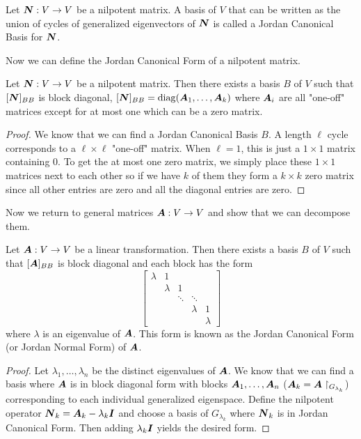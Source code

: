 \begin{definition}
    Let $\boldsymbol{N}:V\to V$ be a nilpotent matrix. A basis of $V$ that can be written as the union of cycles of generalized eigenvectors of $\boldsymbol{N}$ is called a Jordan Canonical Basis for $\boldsymbol{N}$.
\end{definition}

Now we can define the Jordan Canonical Form of a nilpotent matrix.

\begin{theorem}
    Let $\boldsymbol{N}:V\to V$ be a nilpotent matrix. Then there exists a basis $B$ of $V$ such that $[\boldsymbol{N}]_{BB}$ is block diagonal, $[\boldsymbol{N}]_{BB}=\mathrm{diag}(\boldsymbol{A}_1,\dots,\boldsymbol{A}_k)$ where $\boldsymbol{A}_i$ are all "one-off" matrices except for at most one which can be a zero matrix.
\end{theorem}

\begin{proof}
    We know that we can find a Jordan Canonical Basis $B$. A length $\ell$ cycle corresponds to a $\ell\times\ell$ "one-off" matrix. When $\ell=1$, this is just a $1\times 1$ matrix containing $0$. To get the at most one zero matrix, we simply place these $1\times 1$ matrices next to each other so if we have $k$ of them they form a $k\times k$ zero matrix since all other entries are zero and all the diagonal entries are zero.
\end{proof}

Now we return to general matrices $\boldsymbol{A}:V\to V$ and show that we can decompose them.

\begin{theorem}
    Let $\boldsymbol{A}:V\to V$ be a linear transformation. Then there exists a basis $B$ of $V$ such that $[\boldsymbol{A}]_{BB}$ is block diagonal and each block has the form
    \[
    \begin{bmatrix}
        \lambda & 1 & & &\\
        & \lambda & 1 & &\\
        & & \ddots & \ddots &\\
        & & & \lambda & 1\\
        & & & & \lambda
    \end{bmatrix}
    \]
    where $\lambda$ is an eigenvalue of $\boldsymbol{A}$. This form is known as the Jordan Canonical Form (or Jordan Normal Form) of $\boldsymbol{A}$.
\end{theorem}

\begin{proof}
    Let $\lambda_1,\dots,\lambda_n$ be the distinct eigenvalues of $\boldsymbol{A}$. We know that we can find a basis where $\boldsymbol{A}$ is in block diagonal form with blocks $\boldsymbol{A}_1,\dots,\boldsymbol{A}_n$ ($\boldsymbol{A}_k=\boldsymbol{A}\restriction_{G_{\lambda_k}}$) corresponding to each individual generalized eigenspace. Define the nilpotent operator $\boldsymbol{N}_k=\boldsymbol{A}_k-\lambda_k\boldsymbol{I}$ and choose a basis of $G_{\lambda_k}$ where $\boldsymbol{N}_k$ is in Jordan Canonical Form. Then adding $\lambda_k\boldsymbol{I}$ yields the desired form.
\end{proof}

